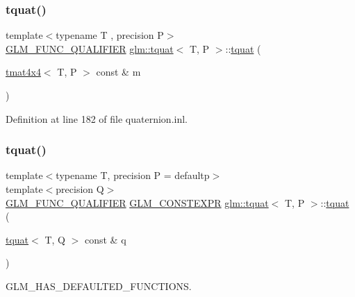 \subsubsection{\texorpdfstring{tquat()}{tquat()}\hspace{0.1cm}{\footnotesize\ttfamily [11/13]}}
{\footnotesize\ttfamily template$<$typename T , precision P$>$ \\
\mbox{\hyperlink{setup_8hpp_a33fdea6f91c5f834105f7415e2a64407}{G\+L\+M\+\_\+\+F\+U\+N\+C\+\_\+\+Q\+U\+A\+L\+I\+F\+I\+ER}} \mbox{\hyperlink{structglm_1_1tquat}{glm\+::tquat}}$<$ T, P $>$\+::\mbox{\hyperlink{structglm_1_1tquat}{tquat}} (\begin{DoxyParamCaption}\item[{\mbox{\hyperlink{structglm_1_1tmat4x4}{tmat4x4}}$<$ T, P $>$ const \&}]{m }\end{DoxyParamCaption})}



Definition at line 182 of file quaternion.\+inl.

\mbox{\label{structglm_1_1tquat_ac5c48665db8dff83698487153ee5b1fc}} 
\subsubsection{\texorpdfstring{tquat()}{tquat()}\hspace{0.1cm}{\footnotesize\ttfamily [12/13]}}
{\footnotesize\ttfamily template$<$typename T, precision P = defaultp$>$ \\
template$<$precision Q$>$ \\
\mbox{\hyperlink{setup_8hpp_a33fdea6f91c5f834105f7415e2a64407}{G\+L\+M\+\_\+\+F\+U\+N\+C\+\_\+\+Q\+U\+A\+L\+I\+F\+I\+ER}} \mbox{\hyperlink{setup_8hpp_a08b807947b47031d3a511f03f89645ad}{G\+L\+M\+\_\+\+C\+O\+N\+S\+T\+E\+X\+PR}} \mbox{\hyperlink{structglm_1_1tquat}{glm\+::tquat}}$<$ T, P $>$\+::\mbox{\hyperlink{structglm_1_1tquat}{tquat}} (\begin{DoxyParamCaption}\item[{\mbox{\hyperlink{structglm_1_1tquat}{tquat}}$<$ T, Q $>$ const \&}]{q }\end{DoxyParamCaption})}



G\+L\+M\+\_\+\+H\+A\+S\+\_\+\+D\+E\+F\+A\+U\+L\+T\+E\+D\+\_\+\+F\+U\+N\+C\+T\+I\+O\+NS. 



